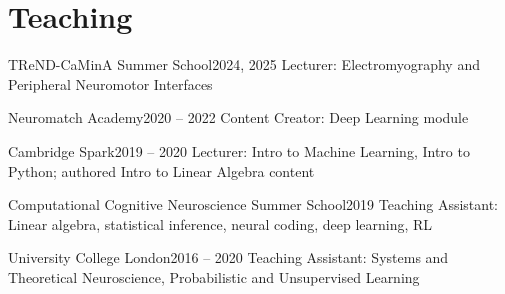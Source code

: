 
\section{Teaching}
\resumeSubHeadingListStart

  \resumeSubheading
    {TReND-CaMinA Summer School}{2024, 2025}
    {Lecturer: Electromyography and Peripheral Neuromotor Interfaces}{}

  \resumeSubheading
    {Neuromatch Academy}{2020 -- 2022}
    {Content Creator: Deep Learning module}{}

  \resumeSubheading
    {Cambridge Spark}{2019 -- 2020}
    {Lecturer: Intro to Machine Learning, Intro to Python; authored Intro to Linear Algebra content}{}

  \resumeSubheading
    {Computational Cognitive Neuroscience Summer School}{2019}
    {Teaching Assistant: Linear algebra, statistical inference, neural coding, deep learning, RL}{}

  \resumeSubheading
    {University College London}{2016 -- 2020}
    {Teaching Assistant: Systems and Theoretical Neuroscience, Probabilistic and Unsupervised Learning}{}

\resumeSubHeadingListEnd